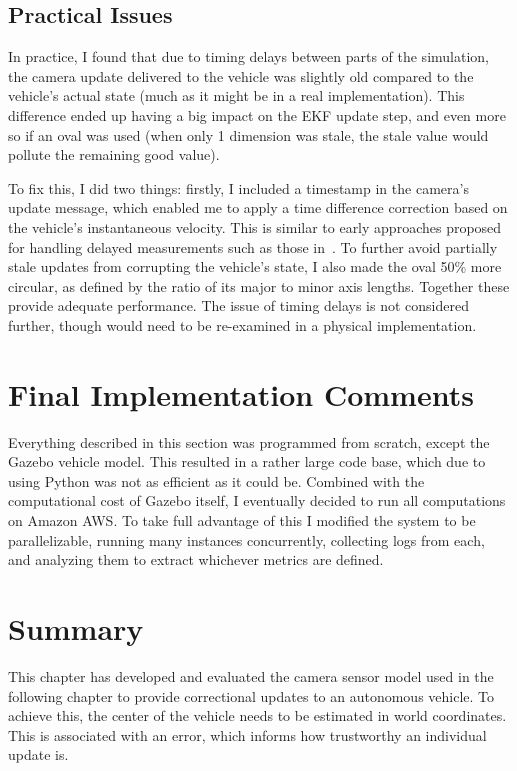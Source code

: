\documentclass[a4paper,12pt,twoside,openright]{report}
\begin{document}
\subsection{Practical Issues}
In practice, I found that due to timing delays between parts of the simulation,
the camera update delivered to the vehicle was slightly old compared to the
vehicle's actual state (much as it might be in a real implementation). This
difference ended up having a big impact on the EKF update step, and even
more so if an oval was used (when only 1 dimension was stale, the stale
value would pollute the remaining good value).

To fix this, I did two things: firstly, I included a timestamp in the 
camera's update message, which enabled me to apply a time difference
correction based on the vehicle's instantaneous velocity. This is 
similar to early approaches proposed for handling delayed measurements
such as those in~\cite{larsen1998incorporation}\cite{tessier2006real}.
To further avoid partially stale updates from corrupting the vehicle's state,
I also made the oval 50\% more circular, as defined by the ratio
of its major to minor axis lengths. Together these 
provide adequate performance. The issue of timing delays is not considered 
further, though would need to be re-examined in a physical implementation.

\section{Final Implementation Comments}
Everything described in this section was programmed from scratch,
except the Gazebo vehicle model. This resulted in a rather large
code base, which due to using Python was not as efficient as it could be.
Combined with the computational cost of Gazebo itself, I eventually
decided to run all computations on Amazon AWS. To take full
advantage of this I modified the system to be 
parallelizable, running many instances concurrently, collecting
logs from each, and analyzing them to extract whichever metrics
are defined.

\section{Summary}

This chapter has developed and evaluated the camera sensor model
used in the following chapter to provide correctional updates
to an autonomous vehicle. To achieve this, the center
of the vehicle needs to be estimated in world coordinates. This
is associated with an error, which informs how trustworthy
an individual update is.
\end{document}
